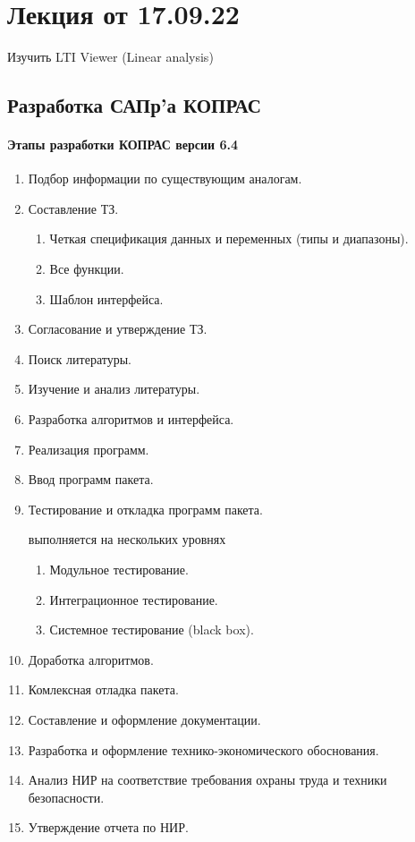 
\section{Лекция от 17.09.22}
Изучить LTI Viewer (Linear analysis)\par
\subsection{Разработка САПр'а КОПРАС}
\paragraph{Этапы разработки КОПРАС версии 6.4}
\begin{enumerate}
	\item Подбор информации по существующим аналогам.
	\item Составление ТЗ.
		{\ttfamily
		\begin{enumerate}
			\item Четкая спецификация данных и переменных (типы и диапазоны).
			\item Все функции.
			\item Шаблон интерфейса.
		\end{enumerate}}
	\item Согласование и утверждение ТЗ.
	\item Поиск литературы.
	\item Изучение и анализ литературы.
	\item Разработка алгоритмов и интерфейса.
	\item Реализация программ.
	\item Ввод программ пакета.
	\item Тестирование и откладка программ пакета.\\{
			выполняется на нескольких уровнях\begin{enumerate}
			\item Модульное тестирование.
			\item Интеграционное тестирование.
			\item Системное тестирование (black box).
		\end{enumerate}}
	\item Доработка алгоритмов.
	\item Комлексная отладка пакета.
	\item Составление и оформление документации.
	\item Разработка и оформление технико-экономического обоснования.
	\item Анализ НИР на соответствие требования охраны труда и техники
		безопасности.
	\item Утверждение отчета по НИР.
\end{enumerate}\par\newpage
